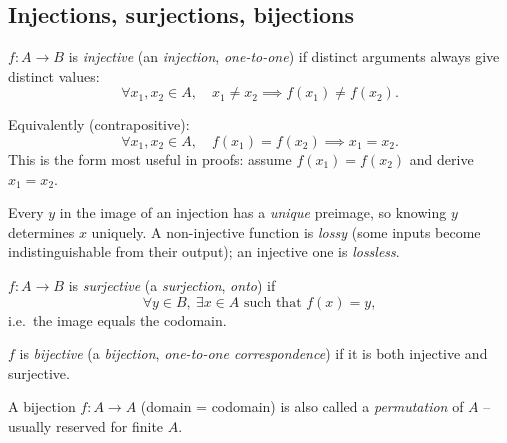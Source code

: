 \subsection{Injections, surjections, bijections}
\label{sec:2-7}

\begin{definition}
$f: A \to B$ is \emph{injective} (an \emph{injection}, \emph{one-to-one}) if distinct arguments always give distinct values:
\[
\forall x_1, x_2 \in A,\quad x_1 \neq x_2 \implies f(x_1) \neq f(x_2).
\]
\end{definition}

\begin{note}
Equivalently (contrapositive):
\[
\forall x_1, x_2 \in A,\quad f(x_1) = f(x_2) \implies x_1 = x_2.
\]
This is the form most useful in proofs: assume $f(x_1)=f(x_2)$ and derive $x_1=x_2$.
\end{note}

\begin{note}
Every $y$ in the image of an injection has a \emph{unique} preimage, so knowing $y$ determines $x$ uniquely. A non-injective function is \emph{lossy} (some inputs become indistinguishable from their output); an injective one is \emph{lossless}.
\end{note}

\begin{definition}
$f: A \to B$ is \emph{surjective} (a \emph{surjection}, \emph{onto}) if
\[
\forall y \in B,\ \exists x \in A \text{ such that } f(x) = y,
\]
i.e.\ the image equals the codomain.
\end{definition}

\begin{definition}[Bijective]
$f$ is \emph{bijective} (a \emph{bijection}, \emph{one-to-one correspondence}) if it is both injective and surjective.
\end{definition}

\begin{note}[Permutation]
A bijection $f: A \to A$ (domain = codomain) is also called a \emph{permutation} of $A$ -- usually reserved for finite $A$.
\end{note}

